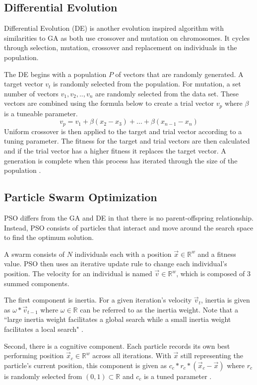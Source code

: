 \documentclass[twoside,11pt]{article}
\newcommand{\Rw}{\mathbb{R}^w }
\begin{document}
\subsection{Differential Evolution}
Differential Evolution (DE) is another evolution inspired algorithm with  similarities to GA as both use crossover and mutation on chromosomes. It cycles through selection, mutation, crossover and replacement on individuals in the population.

The DE begins with a population $P$ of vectors that are randomly generated. A target vector $v_t$ is randomly selected from the population. For mutation, a set number of vectors $v_1, v_2,.., v_n$ are randomly selected from the data set. These vectors are combined using the formula below to create a trial vector $v_p$ where $\beta$ is a tuneable parameter\cite{price2006differential}. $$v_p = v_1 + \beta(x_2 - x_3) + ... + \beta(x_{n-1} - x_n)$$
Uniform crossover is then applied to the target and trial vector according to a tuning parameter. The fitness for the target and trial vectors are then calculated and if the trial vector has a higher fitness it replaces the target vector. A generation is complete when this process has iterated through the size of the population \cite{price2006differential}. 

\subsection{Particle Swarm Optimization}

	PSO differs from the GA and DE in that there is no parent-offspring relationship. Instead, PSO consists of particles that interact and move around the search space to find the optimum solution. 
	
	A swarm consists of $N$ individuals each with a position $\vec{x} \in \Rw$ and a fitness value. 
	PSO then uses an iterative update rule to change each individual's position. The velocity for an individual is named $\vec{v} \in \Rw$, which is composed of 3 summed components.
	
	The first component is inertia. For a given iteration's velocity $\vec{v}_t$, inertia is given as $\omega * \vec{v}_{t-1}$ where $\omega \in \mathbb{R}$ can be referred to as the inertia weight. Note that a ``large inertia weight facilitates a global search while a small inertia weight facilitates a local search" \citep{empirical-pso}.
	
	Second, there is a cognitive component. 
	Each particle records its own best performing position $\vec{x}_c \in \Rw$ across all iterations. 
	With $\vec{x}$ still representing the particle's current position, this component is given as $c_c * r_c * (\vec{x}_c - \vec{x})$ where $r_c$ is randomly selected from $(0,1) \subset \mathbb{R}$ and $c_c$ is a tuned parameter \citep{og-pso}.
	
\end{document}
